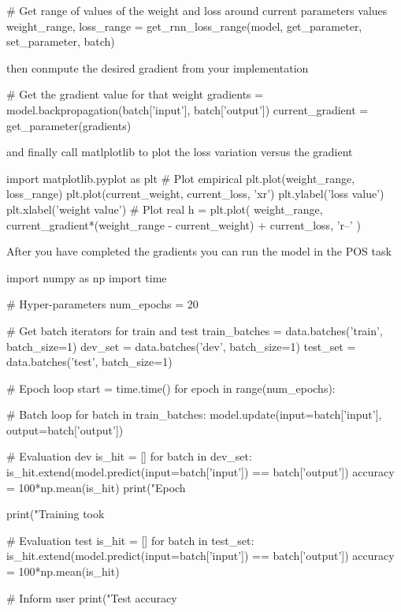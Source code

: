 \begin{exercise}
\begin{python}
# Get range of values of the weight and loss around current parameters values
weight_range, loss_range = get_rnn_loss_range(model, get_parameter, set_parameter, batch)
\end{python}
then conmpute the desired gradient from your implementation
\begin{python}
# Get the gradient value for that weight
gradients = model.backpropagation(batch['input'], batch['output'])
current_gradient = get_parameter(gradients)
\end{python}
and finally call matlplotlib to plot the loss variation versus the gradient
\begin{python}
import matplotlib.pyplot as plt
# Plot empirical
plt.plot(weight_range, loss_range)
plt.plot(current_weight, current_loss, 'xr')
plt.ylabel('loss value')
plt.xlabel('weight value')
# Plot real
h = plt.plot(
    weight_range,
    current_gradient*(weight_range - current_weight) + current_loss, 
    'r--'
)
\end{python}
\clearpage
\noindent After you have completed the gradients you can run the model in the POS task
\begin{python}
import numpy as np
import time

# Hyper-parameters
num_epochs = 20

# Get batch iterators for train and test
train_batches = data.batches('train', batch_size=1)
dev_set = data.batches('dev', batch_size=1)
test_set = data.batches('test', batch_size=1)

# Epoch loop
start = time.time()
for epoch in range(num_epochs):

    # Batch loop
    for batch in train_batches:
        model.update(input=batch['input'], output=batch['output'])

    # Evaluation dev
    is_hit = []
    for batch in dev_set:
        is_hit.extend(model.predict(input=batch['input']) == batch['output'])
    accuracy = 100*np.mean(is_hit)
    print("Epoch %

print("Training took %

# Evaluation test
is_hit = []
for batch in test_set:
    is_hit.extend(model.predict(input=batch['input']) == batch['output'])
accuracy = 100*np.mean(is_hit)

# Inform user
print("Test accuracy %
\end{python}
\end{exercise}

